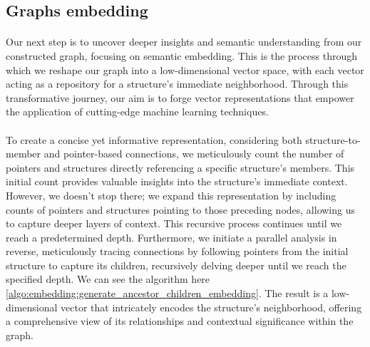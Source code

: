     \subsection{Graphs embedding}

        \paragraph{}Our next step is to uncover deeper insights and semantic understanding from our constructed graph, focusing on semantic embedding. This is the process through which we reshape our graph into a low-dimensional vector space, with each vector acting as a repository for a \gls{structure}'s immediate neighborhood. Through this transformative journey, our aim is to forge vector representations that empower the application of cutting-edge machine learning techniques.

        \paragraph{}To create a concise yet informative representation, considering both structure-to-member and pointer-based connections, we meticulously count the number of \glspl{pointer} and \glspl{structure} directly referencing a specific \gls{structure}'s members. This initial count provides valuable insights into the \gls{structure}'s immediate context. However, we doesn't stop there; we expand this representation by including counts of \glspl{pointer} and \glspl{structure} pointing to those preceding nodes, allowing us to capture deeper layers of context. This recursive process continues until we reach a predetermined depth. Furthermore, we initiate a parallel analysis in reverse, meticulously tracing connections by following \glspl{pointer} from the initial \gls{structure} to capture its children, recursively delving deeper until we reach the specified depth. We can see the algorithm here \ref{algo:embedding:generate_ancestor_children_embedding}. The result is a low-dimensional vector that intricately encodes the \gls{structure}'s neighborhood, offering a comprehensive view of its relationships and contextual significance within the graph.

